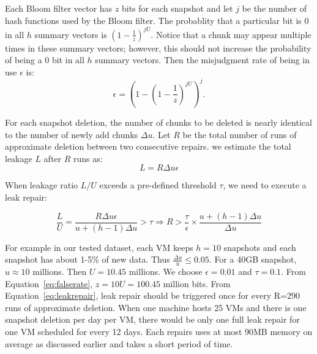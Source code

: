 Each Bloom filter vector has  $z$ bits for each snapshot and let $j$ be the number of hash functions used by the
Bloom filter. The probablity that a particular bit is 0  in all $h$ summary vectors is  
$(1- \frac{1}{z}) ^{j U}$. Notice that a chunk may appear multiple times in these summary vectors; however, this should not 
increase the probability of being a 0 bit in all $h$ summary vectors.
Then the misjudgment rate of being in use $\epsilon$ is: 
\begin{equation}
\label{eq:falserate}
\epsilon = (1-(1-\frac{1}{z})^{jU})^j.
\end{equation}


For each snapshot deletion, the number of chunks to be deleted is nearly identical to the number of
newly add chunks $\Delta u$. 
Let $R$ be the total number of runs of approximate deletion between two consecutive 
repairs. we estimate  the total leakage $L$ after $R$ runs as:
\[
L = R \Delta u \epsilon
\]

When leakage ratio $L/U$ exceeds a pre-defined threshold $\tau$, we need to execute a leak repair:

\begin{equation}
\label{eq:leakrepair}
\frac{L}{U} = \frac{R \Delta u \epsilon}{u+(h-1)\Delta u } > \tau 
\Longrightarrow R > \frac{\tau}{\epsilon}\times\frac{u + (h-1)\Delta u}{\Delta u}
\end{equation}

For example in our tested dataset,  
each VM keeps $h=10$ snapshots and each snapshot has
about 1-5\% of new data. Thus $\frac{\Delta u}{u} \leq 0.05$. For a 40GB snapshot, $u\approx  10$ millions.
Then $U=10.45$ millions.
We choose  $\epsilon = 0.01$ and $\tau=0.1$.  From Equation~\ref{eq:falserate}, 
$z=10U=100.45$ million bits. From Equation~\ref{eq:leakrepair}, 
leak repair should be triggered once for every R=290 runs of approximate deletion. 
When one machine hosts 25 VMs and there is one snapshot deletion per day per VM, there would be 
only one full leak repair for one VM scheduled for every 12 days. Each repairs uses at most  90MB memory on average
as discussed earlier and takes a short period of time.

